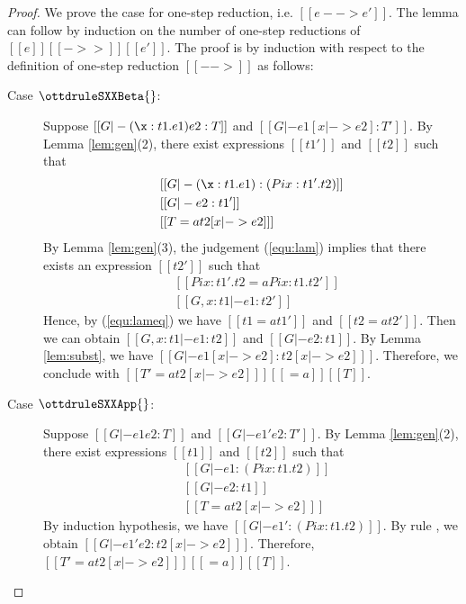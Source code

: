 \begin{proof}
    We prove the case for one-step reduction, i.e. $[[e --> e']]$. The lemma can follow by induction on the number of one-step reductions of $[[e]] [[->>]] [[e']]$.
    The proof is by induction with respect to the definition of one-step reduction $[[-->]]$ as follows:
    \begin{description}
        \item[Case $\ottdruleSXXBeta{}$:] $\quad$ \\
        Suppose $[[G |- (\x:t1.e1)e2 :T]]$ and $[[G |- e1 [x |-> e2] :T']]$. By Lemma \ref{lem:gen}(2), there exist expressions $[[t1']]$ and $[[t2]]$ such that 
        \begin{align}
            &[[G |- (\x:t1.e1):(Pi x:t1'.t2)]] \label{equ:lam} \\
            &[[G |- e2:t1']] \nonumber \\
            &[[T =a t2 [x |-> e2] ]] \nonumber
        \end{align}
        By Lemma \ref{lem:gen}(3), the judgement (\ref{equ:lam}) implies that there exists an expression $[[t2']]$ such that
        \begin{align}
            &[[Pi x:t1'.t2 =a Pi x:t1.t2']] \label{equ:lameq}\\
            &[[G, x:t1 |- e1:t2']] \nonumber
        \end{align}
        Hence, by (\ref{equ:lameq}) we have $[[t1 =a t1']]$ and $[[t2 =a t2']]$. Then we can obtain $[[G, x:t1 |- e1:t2]]$ and $[[G |- e2:t1]]$. By Lemma \ref{lem:subst}, we have $[[G |- e1[x |-> e2] : t2[x |-> e2] ]]$. Therefore, we conclude with $[[T' =a t2[x |-> e2] ]] [[=a]] [[T]]$.
        
        \item[Case $\ottdruleSXXApp{}$:] $\quad$ \\
        Suppose $[[G |- e1 e2 :T]]$ and $[[G |- e1' e2 :T']]$. By Lemma \ref{lem:gen}(2), there exist expressions $[[t1]]$ and $[[t2]]$ such that 
        \begin{align*}
            &[[G |- e1:(Pi x:t1.t2)]] \\
            &[[G |- e2:t1]]\\
            &[[T =a t2 [x |-> e2] ]]
        \end{align*}
        By induction hypothesis, we have $[[G |- e1':(Pi x:t1.t2)]]$. By rule , we obtain $[[G |- e1' e2 : t2[x |-> e2] ]]$. Therefore, $[[T' =a t2[x |-> e2] ]] [[=a]] [[T]]$.
        

\end{description}
\end{proof}
